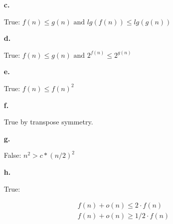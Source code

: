 \documentclass{article}
\begin{document}
\begin{enumerate}
\begin{enumerate}
\item[\textbf{c.}]

True: $f(n) \leq g(n) \text{  and  } lg(f(n)) \leq lg(g(n))$

\item[\textbf{d.}]

True: $f(n) \leq g(n) \text{  and  } 2^{f(n)} \leq 2^{g(n)}$

\item[\textbf{e.}]

True: $f(n) \leq f(n)^2 $

\item[\textbf{f.}]

True by transpose symmetry.

\item[\textbf{g.}]

False: $n^2 > c * (n/2)^2$

\item[\textbf{h.}]

True:

\begin{align*}
f(n) + o(n) \leq 2 \cdot f(n) \\
f(n) + o(n) \geq 1/2 \cdot f(n)
\end{align*} 

\end{enumerate}

\end{enumerate}
\end{document}
